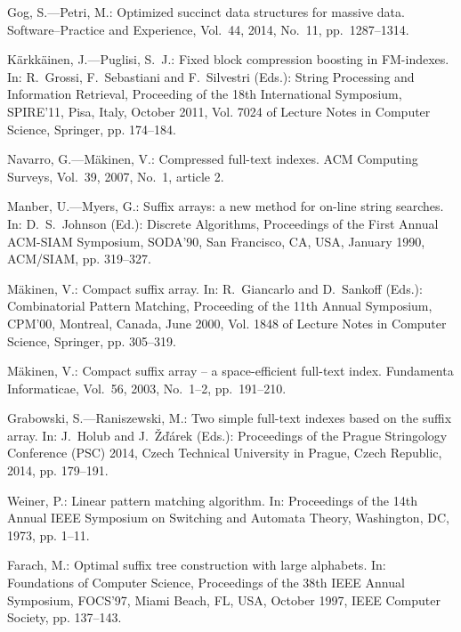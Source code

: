 \documentclass{cai}
\begin{document}
\begin{thebibliography}{99}

Gog, S.---Petri, M.: Optimized succinct data structures for massive data.
  Software--Practice and Experience, Vol.~44, 2014, No.~11, pp.~1287--1314.

K{\"a}rkk{\"a}inen, J.---Puglisi, S.~J.: Fixed block compression boosting in {FM}-indexes. 
  In: R.~Grossi, F.~Sebastiani and F.~Silvestri (Eds.): 
  String Processing and Information Retrieval, 
  Proceeding of the 18th International Symposium, SPIRE'11, Pisa, Italy, October 2011,
  Vol. 7024 of Lecture Notes in Computer Science, Springer, pp. 174--184.

Navarro, G.---M{\"a}kinen, V.: Compressed full-text indexes. ACM Computing Surveys, Vol.~39, 2007, No.~1, article 2.

Manber, U.---Myers, G.: Suffix arrays: a new method for on-line string searches.
  In: D.~S.~Johnson (Ed.):
  Discrete Algorithms,
  Proceedings of the First Annual ACM-SIAM Symposium, SODA'90, San Francisco, CA, USA, January 1990,
  ACM/SIAM, pp. 319--327.

M{\"a}kinen, V.: Compact suffix array. 
  In: R.~Giancarlo and D.~Sankoff (Eds.): 
  Combinatorial Pattern Matching,
  Proceeding of the 11th Annual Symposium, CPM'00, Montreal, Canada, June 2000,
  Vol. 1848 of Lecture Notes in Computer Science, Springer, pp. 305--319.

M{\"a}kinen, V.: Compact suffix array -- a space-efficient full-text index.
  Fundamenta Informaticae, Vol.~56, 2003, No.~1--2, pp.~191--210.

Grabowski, S.---Raniszewski, M.: Two simple full-text indexes based on the suffix
  array. 
  In: J.~Holub and J.~{\v{Z}}{\v{d}}{\'{a}}rek (Eds.): Proceedings of the
  Prague Stringology Conference (PSC) 2014, Czech Technical University in
  Prague, Czech Republic, 2014, pp. 179--191.

Weiner, P.: Linear pattern matching algorithm.
  In: Proceedings of the 14th
  Annual IEEE Symposium on Switching and Automata Theory, Washington, DC, 1973,
  pp. 1--11.

Farach, M.: Optimal suffix tree construction with large alphabets. 
  In: Foundations of Computer Science,
  Proceedings of the 38th IEEE Annual Symposium, FOCS'97, Miami Beach, FL, USA, October 1997,
  IEEE Computer Society, pp. 137--143.


\end{thebibliography}
\end{document}

